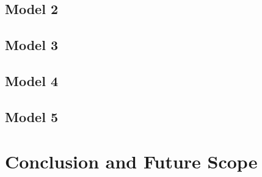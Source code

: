 \documentclass[12pt]{article}
\begin{document}
		\subsection{Model 2}
		\lipsum[1-3]
		\subsection{Model 3}
		\lipsum[1-3]
		\subsection{Model 4}
		\lipsum[1-3]
		\subsection{Model 5}
		\lipsum[1-3]	

	\cleardoublepage
	\section{Conclusion and Future Scope \cite{AlEroud2017}}
	\lipsum[1-4]
	
	\cleardoublepage
	
	
		
	
	
	
	
	
	
	
	
	
	
	
	
	
	
	
	
	
	
	
	
	
\end{document}
